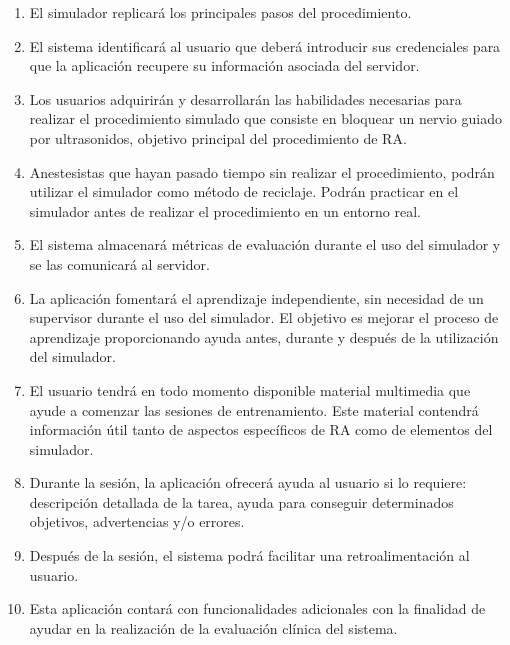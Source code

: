 \begin{enumerate}
    
\item El simulador replicará los principales pasos del procedimiento.
\item El sistema identificará al usuario que deberá introducir sus credenciales para que la aplicación recupere su información asociada del servidor.
\item Los usuarios adquirirán y desarrollarán las habilidades necesarias para realizar el procedimiento simulado que consiste en bloquear un nervio guiado por ultrasonidos, objetivo principal del procedimiento de \ac{RA}.
\item Anestesistas que hayan pasado tiempo sin realizar el procedimiento, podrán utilizar el simulador como método de reciclaje. Podrán practicar en el simulador antes de realizar el procedimiento en un entorno real. 
\item  El sistema almacenará métricas de evaluación durante el uso del simulador y se las comunicará al servidor.
\item  La aplicación fomentará el aprendizaje independiente, sin necesidad de un supervisor durante el uso del simulador. El objetivo es mejorar el proceso de aprendizaje proporcionando ayuda antes, durante y después de la utilización del simulador. 

\item El usuario tendrá en todo momento disponible material multimedia que ayude a comenzar las sesiones de entrenamiento. Este material contendrá información útil tanto de aspectos específicos de \ac{RA} como de elementos del simulador.
\item Durante la sesión, la aplicación ofrecerá ayuda al usuario si lo requiere: descripción detallada de la tarea, ayuda para conseguir determinados objetivos, advertencias y/o errores.
\item Después de la sesión, el sistema podrá facilitar una retroalimentación al usuario.
\item Esta aplicación contará con funcionalidades adicionales con la finalidad de ayudar en la realización de la evaluación clínica del sistema.
\end{enumerate}





